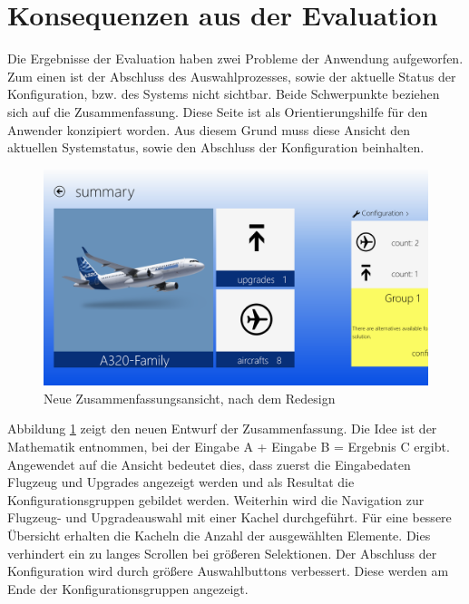 \section{Konsequenzen aus der Evaluation}
Die Ergebnisse der Evaluation haben zwei Probleme der Anwendung aufgeworfen. Zum einen ist der Abschluss des Auswahlprozesses, sowie der aktuelle Status der Konfiguration, bzw. des Systems nicht sichtbar. Beide Schwerpunkte beziehen sich auf die Zusammenfassung. Diese Seite ist als Orientierungshilfe für den Anwender konzipiert worden. Aus diesem Grund muss diese Ansicht den aktuellen Systemstatus, sowie den Abschluss der Konfiguration beinhalten.  
\begin{figure}[H]
\includegraphics[width=\hsize]{images/impl/summary_impl}
\caption{Neue Zusammenfassungsansicht, nach dem Redesign}
\label{redesignSummary}
\end{figure}
Abbildung \ref{redesignSummary} zeigt den neuen Entwurf der Zusammenfassung. Die Idee ist der Mathematik entnommen, bei der Eingabe A + Eingabe B = Ergebnis C ergibt. Angewendet auf die Ansicht bedeutet dies, dass zuerst die Eingabedaten Flugzeug und Upgrades angezeigt werden und als Resultat die Konfigurationsgruppen gebildet werden. Weiterhin wird die Navigation zur Flugzeug- und Upgradeauswahl mit einer Kachel durchgeführt. Für eine bessere Übersicht erhalten die Kacheln die Anzahl der ausgewählten Elemente. Dies verhindert ein zu langes Scrollen bei größeren Selektionen. 
Der Abschluss der Konfiguration wird durch größere Auswahlbuttons verbessert. Diese werden am Ende der Konfigurationsgruppen angezeigt. 